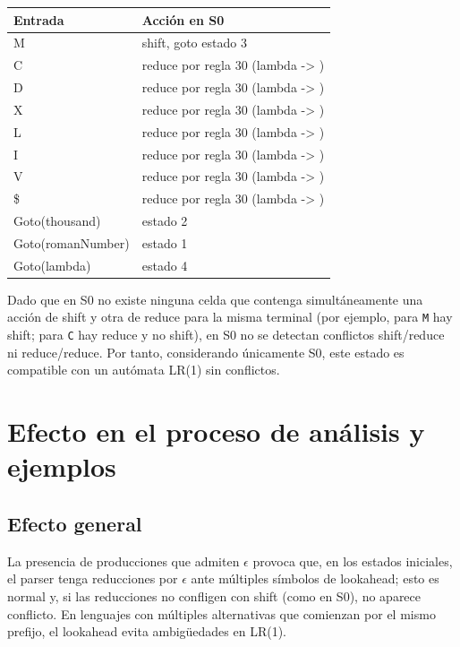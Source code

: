 \documentclass[a4paper,11pt]{article}
\begin{document}
\begin{tabular}{|l|l|}
\hline
Entrada & Acción en S0 \\\hline
M      & shift, goto estado 3 \\\hline
C      & reduce por regla 30 (lambda -> ) \\\hline
D      & reduce por regla 30 (lambda -> ) \\\hline
X      & reduce por regla 30 (lambda -> ) \\\hline
L      & reduce por regla 30 (lambda -> ) \\\hline
I      & reduce por regla 30 (lambda -> ) \\\hline
V      & reduce por regla 30 (lambda -> ) \\\hline
\$      & reduce por regla 30 (lambda -> ) \\\hline
\hline
Goto(thousand) & estado 2 \\\hline
Goto(romanNumber) & estado 1 \\\hline
Goto(lambda) & estado 4 \\\hline
\end{tabular}

Dado que en S0 no existe ninguna celda que contenga simultáneamente una acción de shift y otra de reduce para la misma terminal (por ejemplo, para \texttt{M} hay shift; para \texttt{C} hay reduce y no shift), en S0 no se detectan conflictos shift/reduce ni reduce/reduce. Por tanto, considerando únicamente S0, este estado es compatible con un autómata LR(1) sin conflictos.

\section{Efecto en el proceso de análisis y ejemplos}
\subsection*{Efecto general}
La presencia de producciones que admiten $\epsilon$ provoca que, en los estados iniciales, el parser tenga reducciones por $\epsilon$ ante múltiples símbolos de lookahead; esto es normal y, si las reducciones no confligen con shift (como en S0), no aparece conflicto. En lenguajes con múltiples alternativas que comienzan por el mismo prefijo, el lookahead evita ambigüedades en LR(1).
\end{document}
